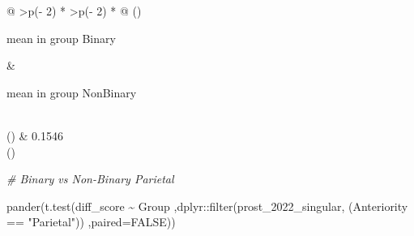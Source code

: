 \documentclass[
]{article}
\newenvironment{Shaded}{\begin{snugshade}}{\end{snugshade}}
\newcommand{\AttributeTok}[1]{\textcolor[rgb]{0.77,0.63,0.00}{#1}}
\newcommand{\CommentTok}[1]{\textcolor[rgb]{0.56,0.35,0.01}{\textit{#1}}}
\newcommand{\ConstantTok}[1]{\textcolor[rgb]{0.00,0.00,0.00}{#1}}
\newcommand{\FunctionTok}[1]{\textcolor[rgb]{0.00,0.00,0.00}{#1}}
\newcommand{\NormalTok}[1]{#1}
\newcommand{\SpecialCharTok}[1]{\textcolor[rgb]{0.00,0.00,0.00}{#1}}
\newcommand{\StringTok}[1]{\textcolor[rgb]{0.31,0.60,0.02}{#1}}
\begin{document}
\begin{longtable}[]{@{}
  >{\centering\arraybackslash}p{(\columnwidth - 2\tabcolsep) * }
  >{\centering\arraybackslash}p{(\columnwidth - 2\tabcolsep) * }@{}}
\toprule()
\begin{minipage}[b]{\linewidth}\centering
mean in group Binary
\end{minipage} & \begin{minipage}[b]{\linewidth}\centering
mean in group NonBinary
\end{minipage} \\
\midrule()
 & 0.1546 \\
\bottomrule()
\end{longtable}

\begin{Shaded}
\begin{Highlighting}[]
\CommentTok{\# Binary vs Non{-}Binary Parietal}

\FunctionTok{pander}\NormalTok{(}\FunctionTok{t.test}\NormalTok{(diff\_score }\SpecialCharTok{\textasciitilde{}}\NormalTok{ Group}
\NormalTok{       ,dplyr}\SpecialCharTok{::}\FunctionTok{filter}\NormalTok{(prost\_2022\_singular, (Anteriority }\SpecialCharTok{==} \StringTok{"Parietal"}\NormalTok{))}
\NormalTok{       ,}\AttributeTok{paired=}\ConstantTok{FALSE}\NormalTok{))}
\end{Highlighting}
\end{Shaded}
\end{document}
